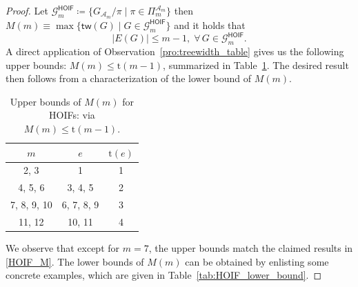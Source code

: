 \documentclass[twoside,11pt]{article}
\newcommand{\partition}{\Pi}
\newcommand{\partitionp}[1]{\partition_{#1}}
\newcommand{\treewidthp}[1]{\mathsf{tw}(#1)}
\newcommand{\graphset}{\mathcal{G}}
\def\calA{\mathcal{A}}
\begin{document}
\begin{proof}
Let $\graphset^{\mathsf{HOIF}}_{m} \coloneqq \{ G_{\calA_m} /\pi \mid \pi \in \partitionp{m}^{\calA_m} \}$ then $M(m) \equiv \max \{ \treewidthp{G} \mid G \in \graphset^{\mathsf{HOIF}}_{m} \}$ and it holds that
\begin{equation*}
| E(G) | \leq m-1, \; \forall \, G \in \graphset^{\mathsf{HOIF}}_{m}.
\end{equation*}
A direct application of Observation~\ref{pro:treewidth_table} gives us the following upper bounds: $M(m) \le \mathrm{t}(m-1)$, summarized in Table~\ref{tab:HOIF_upper_bound}. The desired result then follows from a characterization of the lower bound of $M (m)$.

\begin{table}[ht]
    \centering
    \caption{Upper bounds of $M(m)$ for HOIFs: via $M(m) \leq \mathrm{t}(m-1)$. }
    \label{tab:HOIF_upper_bound}
    \begin{tabular}{ccc}
        \toprule
        $m$ & $e$ & $\mathrm{t}(e)$ \\
        \midrule
        2, 3 & 1 & 1 \\
        4, 5, 6 & 3, 4, 5 & 2 \\
        7, 8, 9, 10 & 6, 7, 8, 9 & 3 \\
        11, 12 & 10, 11 & 4 \\
        \bottomrule
    \end{tabular}
\end{table}

We observe that except for $m=7$, the upper bounds match the claimed results in \eqref{HOIF_M}. The lower bounds of $M(m)$ can be obtained by enlisting some concrete examples, which are given in Table~\ref{tab:HOIF_lower_bound}. 


\end{proof}
\end{document}
